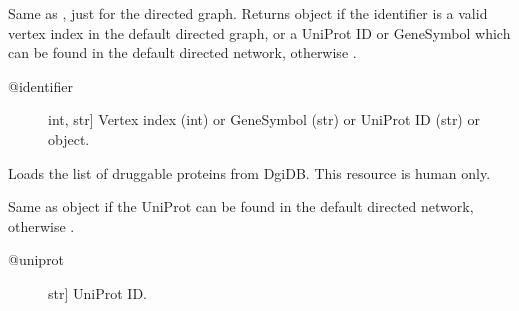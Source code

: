 \documentclass[letterpaper,10pt,english]{sphinxmanual}
\begin{document}
\begin{fulllineitems}

\begin{fulllineitems}
\label{\detokenize{main:pypath.main.PyPath.dp}}
Same as , just for the directed graph.
Returns  object if the identifier
is a valid vertex index in the default directed graph,
or a UniProt ID or GeneSymbol which can be found in the
default directed network, otherwise .
\begin{description}
\item[{@identifier}] \leavevmode{[}int, str{]}
Vertex index (int) or GeneSymbol (str) or UniProt ID (str) or
 object.

\end{description}

\end{fulllineitems}


\begin{fulllineitems}
\label{\detokenize{main:pypath.main.PyPath.dproteins}}
\end{fulllineitems}


\begin{fulllineitems}
\label{\detokenize{main:pypath.main.PyPath.dps}}
\end{fulllineitems}


\begin{fulllineitems}
\label{\detokenize{main:pypath.main.PyPath.druggability_list}}
Loads the list of druggable proteins from DgiDB. This resource
is human only.

\end{fulllineitems}


\begin{fulllineitems}
\label{\detokenize{main:pypath.main.PyPath.duniprot}}
Same as  object if the UniProt
can be found in the default directed network,
otherwise .
\begin{description}
\item[{@uniprot}] \leavevmode{[}str{]}
UniProt ID.


\end{description}
\end{fulllineitems}
\end{fulllineitems}
\end{document}

